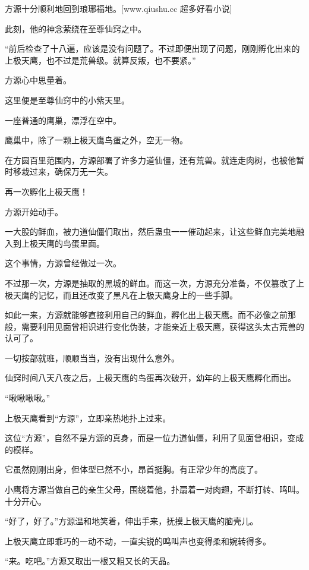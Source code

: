 
\begin{this_body}

方源十分顺利地回到琅琊福地。[www.qiushu.cc 超多好看小说]

此刻，他的神念萦绕在至尊仙窍之中。

“前后检查了十八遍，应该是没有问题了。不过即便出现了问题，刚刚孵化出来的上极天鹰，也不过是荒兽级。就算反叛，也不要紧。”

方源心中思量着。

这里便是至尊仙窍中的小紫天里。

一座普通的鹰巢，漂浮在空中。

鹰巢中，除了一颗上极天鹰鸟蛋之外，空无一物。

在方圆百里范围内，方源部署了许多力道仙僵，还有荒兽。就连走肉树，也被他暂时移栽过来，确保万无一失。

再一次孵化上极天鹰！

方源开始动手。

一大股的鲜血，被力道仙僵们取出，然后蛊虫一一催动起来，让这些鲜血完美地融入到上极天鹰的鸟蛋里面。

这个事情，方源曾经做过一次。

不过那一次，方源是抽取的黑城的鲜血。而这一次，方源充分准备，不仅篡改了上极天鹰的记忆，而且还改变了黑凡在上极天鹰身上的一些手脚。

如此一来，方源就能够直接利用自己的鲜血，孵化出上极天鹰。而不必像之前那般，需要利用见面曾相识进行变化伪装，才能亲近上极天鹰，获得这头太古荒兽的认可了。

一切按部就班，顺顺当当，没有出现什么意外。

仙窍时间八天八夜之后，上极天鹰的鸟蛋再次破开，幼年的上极天鹰孵化而出。

“啾啾啾啾。”

上极天鹰看到“方源”，立即亲热地扑上过来。

这位“方源”，自然不是方源的真身，而是一位力道仙僵，利用了见面曾相识，变成的模样。

它虽然刚刚出身，但体型已然不小，昂首挺胸。有正常少年的高度了。

小鹰将方源当做自己的亲生父母，围绕着他，扑扇着一对肉翅，不断打转、鸣叫。十分开心。

“好了，好了。”方源温和地笑着，伸出手来，抚摸上极天鹰的脑壳儿。

上极天鹰立即乖巧的一动不动，一直尖锐的鸣叫声也变得柔和婉转得多。

“来。吃吧。”方源又取出一根又粗又长的天晶。


\end{this_body}
